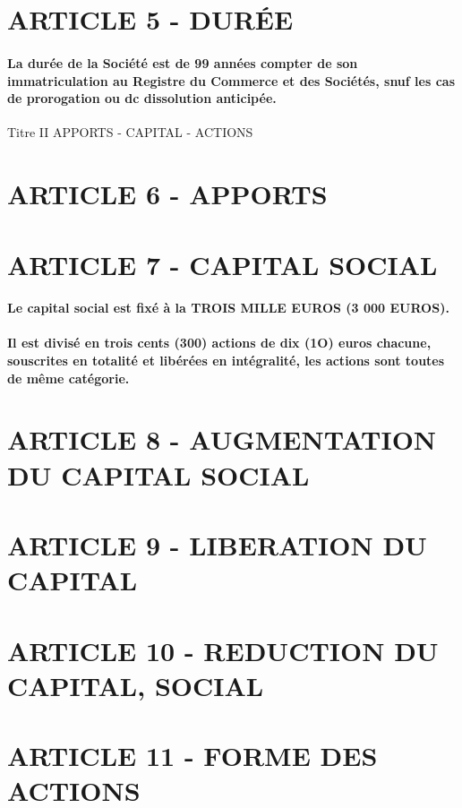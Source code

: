 \documentclass[a4paper, 11pt]{article}
\begin{document}
\section*{ARTICLE 5 - DURÉE}

\paragraph{
  La durée de la Société est de 99 années compter de son immatriculation au Registre du Commerce et des Sociétés, snuf les cas de prorogation ou dc dissolution anticipée.
}

Titre II
APPORTS - CAPITAL - ACTIONS

\section*{ARTICLE 6 - APPORTS}

\section*{ARTICLE 7 - CAPITAL SOCIAL}

\paragraph{
  Le capital social est fixé à la TROIS MILLE EUROS (3 000 EUROS).
}

\paragraph{
  Il est divisé en trois cents (300) actions de dix (1O) euros chacune, souscrites en totalité et libérées en intégralité, les actions sont toutes de même catégorie.
}

\section*{ARTICLE 8 - AUGMENTATION DU CAPITAL SOCIAL}

\section*{ARTICLE 9 - LIBERATION DU CAPITAL}

\section*{ARTICLE 10 - REDUCTION DU CAPITAL, SOCIAL}

\section*{ARTICLE 11 - FORME DES ACTIONS}
\end{document}
